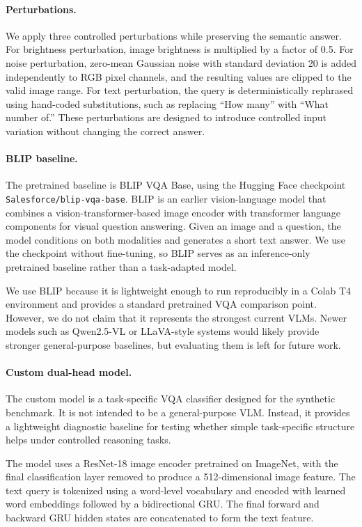 \paragraph{Perturbations.}
We apply three controlled perturbations while preserving the semantic answer. For brightness perturbation, image brightness is multiplied by a factor of 0.5. For noise perturbation, zero-mean Gaussian noise with standard deviation 20 is added independently to RGB pixel channels, and the resulting values are clipped to the valid image range. For text perturbation, the query is deterministically rephrased using hand-coded substitutions, such as replacing ``How many'' with ``What number of.'' These perturbations are designed to introduce controlled input variation without changing the correct answer.

\paragraph{BLIP baseline.}
The pretrained baseline is BLIP VQA Base, using the Hugging Face checkpoint \texttt{Salesforce/blip-vqa-base}. BLIP is an earlier vision-language model that combines a vision-transformer-based image encoder with transformer language components for visual question answering. Given an image and a question, the model conditions on both modalities and generates a short text answer. We use the checkpoint without fine-tuning, so BLIP serves as an inference-only pretrained baseline rather than a task-adapted model.

We use BLIP because it is lightweight enough to run reproducibly in a Colab T4 environment and provides a standard pretrained VQA comparison point. However, we do not claim that it represents the strongest current VLMs. Newer models such as Qwen2.5-VL or LLaVA-style systems would likely provide stronger general-purpose baselines, but evaluating them is left for future work.

\paragraph{Custom dual-head model.}
The custom model is a task-specific VQA classifier designed for the synthetic benchmark. It is not intended to be a general-purpose VLM. Instead, it provides a lightweight diagnostic baseline for testing whether simple task-specific structure helps under controlled reasoning tasks.

The model uses a ResNet-18 image encoder pretrained on ImageNet, with the final classification layer removed to produce a 512-dimensional image feature. The text query is tokenized using a word-level vocabulary and encoded with learned word embeddings followed by a bidirectional GRU. The final forward and backward GRU hidden states are concatenated to form the text feature.

